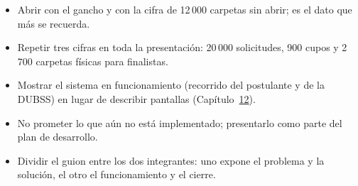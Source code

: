 \begin{itemize}
    \item Abrir con el gancho y con la cifra de 12\,000 carpetas sin abrir; es el dato que más se recuerda.
    \item Repetir tres cifras en toda la presentación: 20\,000 solicitudes, 900 cupos y 2\,700 carpetas físicas para finalistas.
    \item Mostrar el sistema en funcionamiento (recorrido del postulante y de la DUBSS) en lugar de describir pantallas (Capítulo~\hyperref[cap:producto]{12}).
    \item No prometer lo que aún no está implementado; presentarlo como parte del plan de desarrollo.
    \item Dividir el guion entre los dos integrantes: uno expone el problema y la solución, el otro el funcionamiento y el cierre.
\end{itemize}
